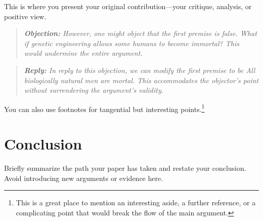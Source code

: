 \documentclass[11pt, a4paper]{article}
\newenvironment{objection}{\begin{quote}\itshape\textbf{Objection: }}{\end{quote}} %
\newenvironment{reply}{\begin{quote}\itshape\textbf{Reply: }}{\end{quote}} %
\begin{document}
This is where you present your original contribution—your critique, analysis, or positive view.

\begin{objection}
    However, one might object that the first premise is false. What if genetic engineering allows some humans to become immortal? This would undermine the entire argument.
\end{objection}

\begin{reply}
    In reply to this objection, we can modify the first premise to be \textit{All biologically natural men are mortal}. This accommodates the objector's point without surrendering the argument's validity.
\end{reply}

You can also use footnotes for tangential but interesting points.\footnote{This is a great place to mention an interesting aside, a further reference, or a complicating point that would break the flow of the main argument.}

\section{Conclusion}
\label{sec:conclusion}

Briefly summarize the path your paper has taken and restate your conclusion. Avoid introducing new arguments or evidence here.

\printbibliography
\end{document}
